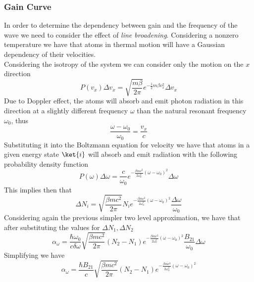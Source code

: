 \documentclass[../electromagnetism.tex]{subfiles}
\begin{document}
\subsubsection{Gain Curve}
In order to determine the dependency between gain and the frequency of the wave we need to consider the effect of \textit{line broadening}. Considering a nonzero temperature we have that atoms in thermal motion will have a Gaussian dependency of their velocities.\\
Considering the isotropy of the system we can consider only the motion on the $x$ direction
\begin{equation}
	P(v_x)\Delta v_x=\sqrt{\frac{m\beta}{2\pi}}e^{-\frac{1}{2}m\beta v_x^2}\Delta v_x
	\label{eq:gaussianvel.se}
\end{equation}
Due to Doppler effect, the atoms will absorb and emit photon radiation in this direction at a slightly different frequency $\omega$ than the natural resonant frequency $\omega_0$, thus
\begin{equation}
	\frac{\omega-\omega_0}{\omega_0}=\frac{v_x}{c}
	\label{eq:doppler.se}
\end{equation}
Substituting it into the Boltzmann equation for velocity we have that atoms in a given energy state $\ket{i}$ will absorb and emit radiation with the following probability density function
\begin{equation}
	P(\omega)\Delta\omega=\frac{c}{\omega_0}e^{-\frac{\beta mc^2}{2\omega_0^2}(\omega-\omega_0)^2}\Delta\omega
	\label{eq:probomega.se}
\end{equation}
This implies then that
\begin{equation}
	\Delta N_i=\sqrt{\frac{\beta mc^2}{2\pi}}N_ie^{-\frac{\beta mc^2}{2\omega_0^2}(\omega-\omega_0)^2}\frac{\Delta\omega}{\omega_0}
	\label{eq:variationpop.se}
\end{equation}
Considering again the previous simpler two level approximation, we have that after substituting the values for $\Delta N_1, \Delta N_2$
\begin{equation*}
	\alpha_\omega=\frac{\hbar\omega_0}{c\delta\omega}\sqrt{\frac{\beta mc^2}{2\pi}}(N_2-N_1)e^{-\frac{\beta mc^2}{2\omega_0^2}(\omega-\omega_0)^2}\frac{B_{21}}{\omega_0}\Delta\omega
	\label{eq:gainconst.se}
\end{equation*}
Simplifying we have
\begin{equation}
	\alpha_\omega=\frac{\hbar B_{21}}{c}\sqrt{\frac{\beta mc^2}{2\pi}}\left( N_2-N_1 \right)e^{-\frac{\beta mc^2}{2\omega_0^2}(\omega-\omega_0)^2}
	\label{eq:gainconst.se}
\end{equation}
\end{document}
